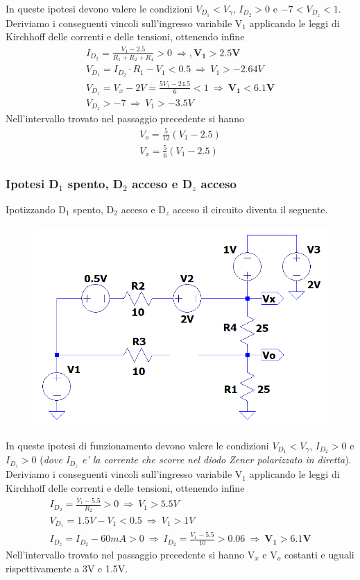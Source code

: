 \documentclass[a4paper,10pt]{article}
\begin{document}
\noindent In queste ipotesi devono valere le condizioni $V_{D_1}<V_{\gamma}$, $I_{D_2}>0$ e $-7<V_{D_z}<1$. Deriviamo i conseguenti vincoli sull'ingresso variabile V$_1$ applicando le leggi di Kirchhoff delle correnti e delle tensioni, ottenendo infine
	\begin{gather*}
		I_{D_2} = \frac{V_1-2.5}{R_1+R_2+R_4}>0 \ \Rightarrow , \mathbf{V_1 > 2.5V}\\
		V_{D_1} = I_{D_2}\cdot R_1 - V_1 < 0.5 \ \Rightarrow \ V_{1} > -2.64V \\
		V_{D_z} = V_x - 2V = \frac{5V_1-24.5}{6} < 1  \ \Rightarrow \ \mathbf{V_{1} < 6.1V} \\
		V_{D_z} > -7 \ \Rightarrow \ V_{1} > -3.5V
	\end{gather*}
Nell'intervallo trovato nel passaggio precedente si hanno
	\begin{gather*}
		V_o = \frac{5}{12}(V_1 - 2.5) \\
		V_x = \frac{5}{6} (V_1 - 2.5)
	\end{gather*}

\subsubsection{Ipotesi D$_1$ spento, D$_2$ acceso e D$_z$ acceso}
Ipotizzando D$_1$ spento, D$_2$ acceso e D$_z$ acceso il circuito diventa il seguente. \newline
\begin{figure}[h!]
  	\centering
 	\includegraphics[width=0.3\linewidth]{es1-1-2.png}
\end{figure}

\noindent In queste ipotesi di funzionamento devono valere le condizioni $V_{D_1} < V_{\gamma}$, $I_{D_2} > 0$ e $I_{D_z} > 0$ (\textit{dove I$_{D_z}$ e' la corrente che scorre nel diodo Zener polarizzato in diretta}).
Deriviamo i conseguenti vincoli sull'ingresso variabile V$_1$ applicando le leggi di Kirchhoff delle correnti e delle tensioni, ottenendo infine
	\begin{gather*}
		I_{D_2} = \frac{V_1 - 5.5}{R_2} > 0 \ \Rightarrow \ V_{1} > 5.5V \\
		V_{D_1} = 1.5V - V_1 < 0.5 \ \Rightarrow \ V_{1} > 1V \\
		I_{D_z} = I_{D_2} - 60mA > 0 \ \Rightarrow \ I_{D_2} = \frac{V_1 - 5.5}{10} > 0.06 \ \Rightarrow \ \mathbf{V_1 > 6.1V}
	\end{gather*}
Nell'intervallo trovato nel passaggio precedente si hanno V$_x$ e V$_o$ costanti e uguali rispettivamente a 3V e 1.5V.
	
\end{document}
